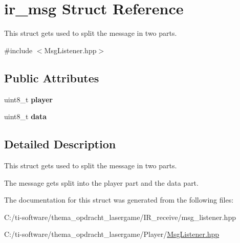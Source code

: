 \hypertarget{structir__msg}{}\section{ir\+\_\+msg Struct Reference}
\label{structir__msg}


This struct gets used to split the message in two parts.  




{\ttfamily \#include $<$Msg\+Listener.\+hpp$>$}

\subsection*{Public Attributes}
\begin{DoxyCompactItemize}
\item 
\mbox{\label{structir__msg_a1aba19ec600f05dbf3e20cd94585f2b7}} 
uint8\+\_\+t {\bfseries player}
\item 
\mbox{\label{structir__msg_a186ea1a98c46be88a9664b2ca285566f}} 
uint8\+\_\+t {\bfseries data}
\end{DoxyCompactItemize}


\subsection{Detailed Description}
This struct gets used to split the message in two parts. 

The message gets split into the player part and the data part. 

The documentation for this struct was generated from the following files\+:\begin{DoxyCompactItemize}
\item 
C\+:/ti-\/software/thema\+\_\+opdracht\+\_\+lasergame/\+I\+R\+\_\+receive/msg\+\_\+listener.\+hpp\item 
C\+:/ti-\/software/thema\+\_\+opdracht\+\_\+lasergame/\+Player/\mbox{\hyperlink{_msg_listener_8hpp}{Msg\+Listener.\+hpp}}\end{DoxyCompactItemize}
